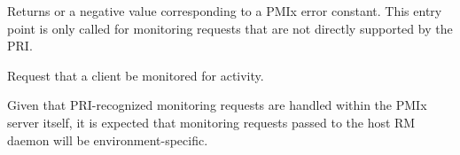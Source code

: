 Returns  or a negative value corresponding to a PMIx error constant. This entry point is only called for monitoring requests that are not directly supported by the \ac{PRI}.

\descr

Request that a client be monitored for activity.

\adviceimplstart
Given that \ac{PRI}-recognized monitoring requests are handled within the PMIx server itself, it is expected that monitoring requests passed to the host RM daemon will be environment-specific.
\adviceimplend

